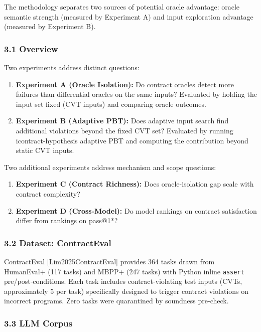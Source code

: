 
The methodology separates two sources of potential oracle advantage: oracle semantic strength (measured by Experiment A) and input exploration advantage (measured by Experiment B).

\subsubsection{3.1 Overview}

Two experiments address distinct questions:

\begin{enumerate}
\item \textbf{Experiment A (Oracle Isolation):} Do contract oracles detect more failures than differential oracles on the same inputs? Evaluated by holding the input set fixed (CVT inputs) and comparing oracle outcomes.
\item \textbf{Experiment B (Adaptive PBT):} Does adaptive input search find additional violations beyond the fixed CVT set? Evaluated by running icontract-hypothesis adaptive PBT and computing the contribution beyond static CVT inputs.
\end{enumerate}

Two additional experiments address mechanism and scope questions:

\begin{enumerate}
\item \textbf{Experiment C (Contract Richness):} Does oracle-isolation gap scale with contract complexity?
\item \textbf{Experiment D (Cross-Model):} Do model rankings on contract satisfaction differ from rankings on pass@1*?
\end{enumerate}

\subsubsection{3.2 Dataset: ContractEval}

ContractEval [Lim2025ContractEval] provides 364 tasks drawn from HumanEval+ (117 tasks) and MBPP+ (247 tasks) with Python inline \texttt{assert} pre/post-conditions. Each task includes contract-violating test inputs (CVTs, approximately 5 per task) specifically designed to trigger contract violations on incorrect programs. Zero tasks were quarantined by soundness pre-check.

\subsubsection{3.3 LLM Corpus}

